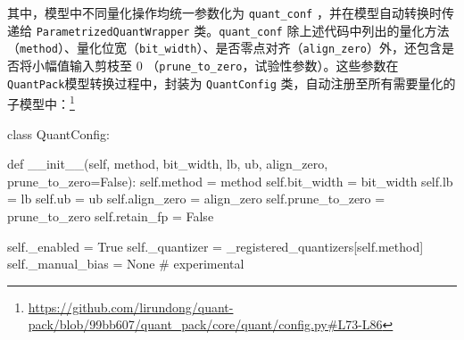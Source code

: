 \documentclass[
]{shtthesis}
\providecommand{\QP}{\texttt{QuantPack}}
\begin{document}
其中，模型中不同量化操作均统一参数化为 \verb|quant_conf| ，并在模型自动转换时传递给 \verb|ParametrizedQuantWrapper| 类。\verb|quant_conf| 除上述代码中列出的量化方法（\verb|method|）、量化位宽（\verb|bit_width|）、是否零点对齐（\verb|align_zero|）外，还包含是否将小幅值输入剪枝至 0 （\verb|prune_to_zero|，试验性参数）。这些参数在 \QP 模型转换过程中，封装为 \verb|QuantConfig| 类，自动注册至所有需要量化的子模型中：\footnote{\url{https://github.com/lirundong/quant-pack/blob/99bb607/quant_pack/core/quant/config.py\#L73-L86}}
\begin{python}
class QuantConfig:

    def __init__(self, method, bit_width, lb, ub, align_zero, prune_to_zero=False):
        self.method = method
        self.bit_width = bit_width
        self.lb = lb
        self.ub = ub
        self.align_zero = align_zero
        self.prune_to_zero = prune_to_zero
        self.retain_fp = False

        self._enabled = True
        self._quantizer = _registered_quantizers[self.method]
        self._manual_bias = None  # experimental
\end{python}
\end{document}
